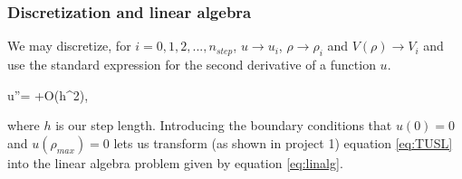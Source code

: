 \documentclass[a4paper,10pt,english]{article}
\numberwithin{figure}{subsection}
\numberwithin{table}{subsection}
\numberwithin{equation}{subsection}
\begin{document}
\subsubsection{Discretization and linear algebra}

We may discretize, for $i=0,1,2,...,n_{step}$, 
$u \rightarrow u_i$, $\rho \rightarrow \rho_i$ and $V(\rho) \rightarrow V_i$
 and use the standard expression for the second derivative
of a function $u$.

\eqs u''= +O(h^2),
    \label{eq:diffoperation} \eqf

where $h$ is our step length.
Introducing the boundary conditions that $u(0) = 0$ and $u(\rho_{max}) = 0$ 
lets us transform
(as shown in project 1)
equation \ref{eq:TUSL} into the linear algebra problem given by equation \ref{eq:linalg}.
\end{document}
